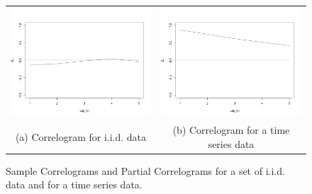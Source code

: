 \begin{figure}
\begin{center}
\caption{\label{Figure:PreliminariesCorrelograms}Sample Correlograms and Partial Correlograms for a set of i.i.d. data and for a time series data.}
\begin{tabular}{cc}
\includegraphics[scale=0.25]{./figures/CorrelogramGaussian} &
\includegraphics[scale=0.25]{./figures/CorrelogramTimeSerie} \\
(a) Correlogram for i.i.d. data & (b) Correlogram for a time series data \\

\end{tabular}
\end{center}
\end{figure}
